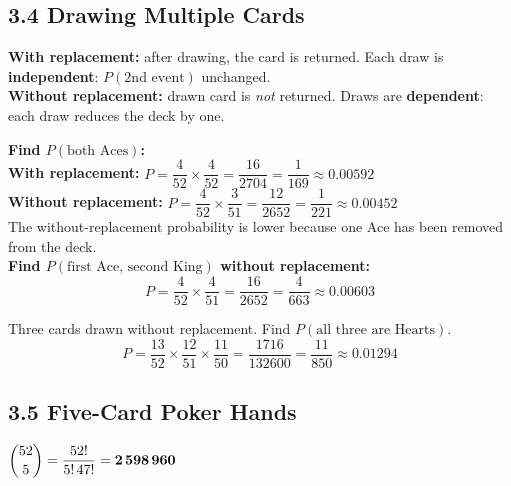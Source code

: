 \documentclass[12pt]{article}
\begin{document}
\subsection{3.4 Drawing Multiple Cards}

\begin{defbox}
\textbf{With replacement:} after drawing, the card is returned. Each draw is \textbf{independent}: $P(\text{2nd event})$ unchanged.\\[4pt]
\textbf{Without replacement:} drawn card is \textit{not} returned. Draws are \textbf{dependent}: each draw reduces the deck by one.
\end{defbox}

\begin{examplebox}
\textbf{Find $P(\text{both Aces})$:}\\[4pt]
\textbf{With replacement:} $P=\dfrac{4}{52}\times\dfrac{4}{52}=\dfrac{16}{2704}=\dfrac{1}{169}\approx0.00592$\\[6pt]
\textbf{Without replacement:} $P=\dfrac{4}{52}\times\dfrac{3}{51}=\dfrac{12}{2652}=\dfrac{1}{221}\approx0.00452$\\[6pt]
The without-replacement probability is lower because one Ace has been removed from the deck.\\[4pt]
\textbf{Find $P(\text{first Ace, second King})$ without replacement:}
\[P=\frac{4}{52}\times\frac{4}{51}=\frac{16}{2652}=\frac{4}{663}\approx0.00603\]
\end{examplebox}

\begin{examplebox}
Three cards drawn without replacement. Find $P(\text{all three are Hearts})$.
\[P=\frac{13}{52}\times\frac{12}{51}\times\frac{11}{50}=\frac{1716}{132600}=\frac{11}{850}\approx0.01294\]
\end{examplebox}

\subsection{3.5 Five-Card Poker Hands}

\begin{defbox}
$\dbinom{52}{5}=\dfrac{52!}{5!\,47!}=\mathbf{2\,598\,960}$
\end{defbox}
\end{document}
